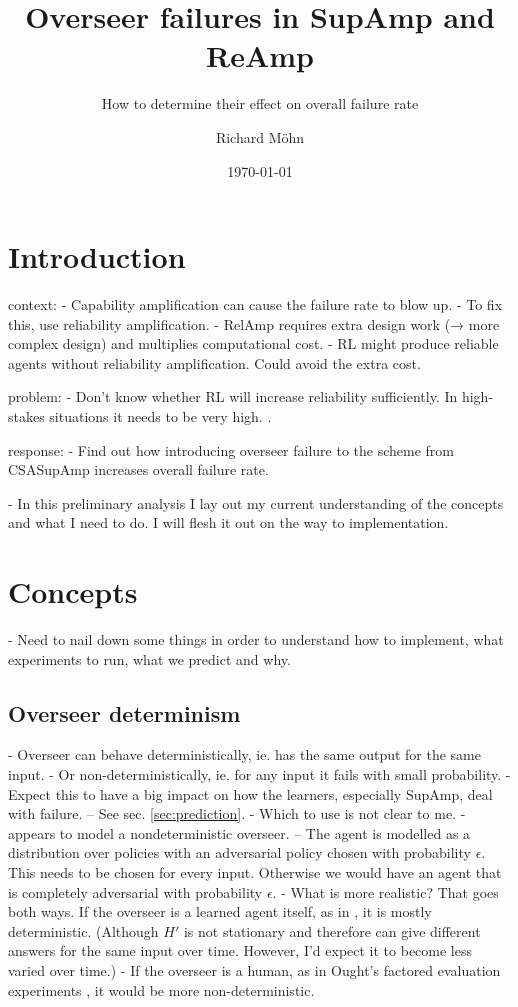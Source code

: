 \documentclass{farlamp}
\title{Overseer failures in SupAmp and ReAmp}
\subtitle{How to determine their effect on overall failure rate}
\author{Richard Möhn}
\date{\today}
\begin{document}
\maketitle
\tableofcontents

\section{Introduction}

context:
- Capability amplification can cause the failure rate to blow up.
- To fix this, use reliability amplification.
- RelAmp requires extra design work (→ more complex design) and multiplies
computational cost.
- RL might produce reliable agents without reliability amplification. Could
avoid the extra cost.

problem:
- Don't know whether RL will increase reliability sufficiently. In high-stakes
situations it needs to be very high. \cite[Cf.][]{ChriLearnCata}.

response:
- Find out how introducing overseer failure to the scheme from CSASupAmp
increases overall failure rate.

- In this preliminary analysis I lay out my current understanding of the
concepts and what I need to do. I will flesh it out on the way to
implementation.


\section{Concepts}

- Need to nail down some things in order to understand how to implement, what
experiments to run, what we predict and why.


\subsection{Overseer determinism}

- Overseer can behave deterministically, ie. has the same output for the same
input.
- Or non-deterministically, ie. for any input it fails with small probability.
- Expect this to have a big impact on how the learners, especially SupAmp, deal
with failure. – See sec. \ref{sec:prediction}.
- \OQ Which to use is not clear to me.
    - \textcite{ChriRelAmp} appears to model a nondeterministic overseer. – The
    agent is modelled as a distribution over policies with an adversarial policy
    chosen with probability $\epsilon$. This needs to be chosen for every input.
    Otherwise we would have an agent that is completely adversarial with
    probability $\epsilon$.
    - What is more realistic? That goes both ways. If the overseer is a learned
    agent itself, as in \textcite{CSASupAmp}, it is mostly deterministic.
    (Although $H'$ is not stationary and therefore can give different answers
    for the same input over time. However, I'd expect it to become less varied
    over time.)
    - If the overseer is a human, as in Ought's factored evaluation experiments
    \parencite{StuhDelCog}, it would be more non-deterministic.
\end{document}
